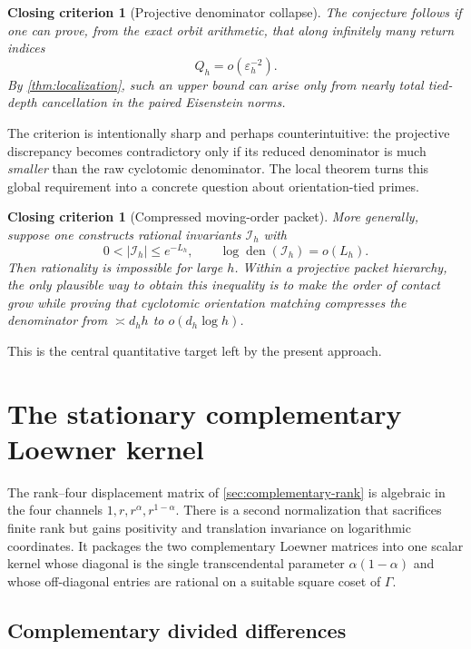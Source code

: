 \documentclass[11pt]{article}
\newtheorem{criterion}[theorem]{Closing criterion}
\theoremstyle{definition}
\theoremstyle{remark}
\newcommand{\den}{\operatorname{den}}
\newcommand{\eps}{\varepsilon}
\begin{document}
\begin{criterion}[Projective denominator collapse]\label{crit:den-collapse}
The conjecture follows if one can prove, from the exact orbit arithmetic, that along infinitely many return indices
\begin{equation}\label{eq:collapse-condition}
 Q_h=o(\eps_h^{-2}).
\end{equation}
By \cref{thm:localization}, such an upper bound can arise only from nearly total tied-depth cancellation in the paired Eisenstein norms.
\end{criterion}

The criterion is intentionally sharp and perhaps counterintuitive: the projective discrepancy becomes contradictory only if its reduced denominator is much \emph{smaller} than the raw cyclotomic denominator.  The local theorem turns this global requirement into a concrete question about orientation-tied primes.

\begin{criterion}[Compressed moving-order packet]\label{crit:moving-order}
More generally, suppose one constructs rational invariants $\mathcal I_h$ with
\[
 0<|\mathcal I_h|\le e^{-L_h},
 \qquad
 \log\den(\mathcal I_h)=o(L_h).
\]
Then rationality is impossible for large $h$.  Within a projective packet hierarchy, the only plausible way to obtain this inequality is to make the order of contact grow while proving that cyclotomic orientation matching compresses the denominator from $\asymp d_hh$ to $o(d_h\log h)$.
\end{criterion}

This is the central quantitative target left by the present approach.


\section{The stationary complementary Loewner kernel}
\label{sec:stationary-kernel}

The rank--four displacement matrix of \cref{sec:complementary-rank} is algebraic in the four channels
$1,r,r^\alpha,r^{1-\alpha}$.  There is a second normalization that sacrifices finite rank but gains positivity and translation invariance on logarithmic coordinates.  It packages the two complementary Loewner matrices into one scalar kernel whose diagonal is the single transcendental parameter $\alpha(1-\alpha)$ and whose off-diagonal entries are rational on a suitable square coset of $\Gamma$.

\subsection{Complementary divided differences}
\end{document}
